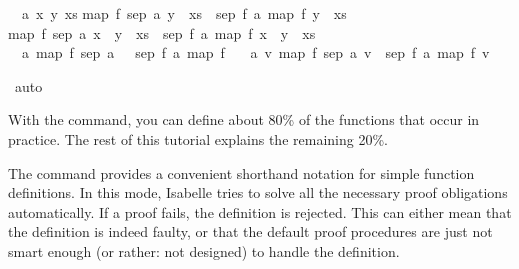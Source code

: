 \begin{isabellebody}
\begin{isamarkuptxt}
  \begin{isabelle}%
\ {}{\isachardot}\ {\isasymAnd}a\ x\ y\ xs{\isachardot}\isanewline
{}map\ f\ {\isacharparenleft}sep\ a\ {\isacharparenleft}y\ {\isacharhash}\ xs{\isacharparenright}{\isacharparenright}\ {\isacharequal}\ sep\ {\isacharparenleft}f\ a{\isacharparenright}\ {\isacharparenleft}map\ f\ {\isacharparenleft}y\ {\isacharhash}\ xs{\isacharparenright}{\isacharparenright}\ {\isasymLongrightarrow}\isanewline
{}map\ f\ {\isacharparenleft}sep\ a\ {\isacharparenleft}x\ {\isacharhash}\ y\ {\isacharhash}\ xs{\isacharparenright}{\isacharparenright}\ {\isacharequal}\ sep\ {\isacharparenleft}f\ a{\isacharparenright}\ {\isacharparenleft}map\ f\ {\isacharparenleft}x\ {\isacharhash}\ y\ {\isacharhash}\ xs{\isacharparenright}{\isacharparenright}\isanewline
\ {}{\isachardot}\ {\isasymAnd}a{\isachardot}\ map\ f\ {\isacharparenleft}sep\ a\ {\isacharbrackleft}{\isacharbrackright}{\isacharparenright}\ {\isacharequal}\ sep\ {\isacharparenleft}f\ a{\isacharparenright}\ {\isacharparenleft}map\ f\ {\isacharbrackleft}{\isacharbrackright}{\isacharparenright}\isanewline
\ {}{\isachardot}\ {\isasymAnd}a\ v{\isachardot}\ map\ f\ {\isacharparenleft}sep\ a\ {\isacharbrackleft}v{\isacharbrackright}{\isacharparenright}\ {\isacharequal}\ sep\ {\isacharparenleft}f\ a{\isacharparenright}\ {\isacharparenleft}map\ f\ {\isacharbrackleft}v{\isacharbrackright}{\isacharparenright}%
\end{isabelle}%
\end{isamarkuptxt}%
\isamarkuptrue%
\isamarkupfalse%
\ auto\ \isanewline
{}\isamarkupfalse%
%
\endisatagproof
{\isafoldproof}%
%
\isadelimproof
%
\endisadelimproof
%
\begin{isamarkuptext}%
With the  command, you can define about 80\% of the
  functions that occur in practice. The rest of this tutorial explains
  the remaining 20\%.%
\end{isamarkuptext}%
\isamarkuptrue%
%
\isamarkuptrue%
%
\begin{isamarkuptext}%
The  command provides a
  convenient shorthand notation for simple function definitions. In
  this mode, Isabelle tries to solve all the necessary proof obligations
  automatically. If a proof fails, the definition is
  rejected. This can either mean that the definition is indeed faulty,
  or that the default proof procedures are just not smart enough (or
  rather: not designed) to handle the definition.


\end{isamarkuptext}
\end{isabellebody}
